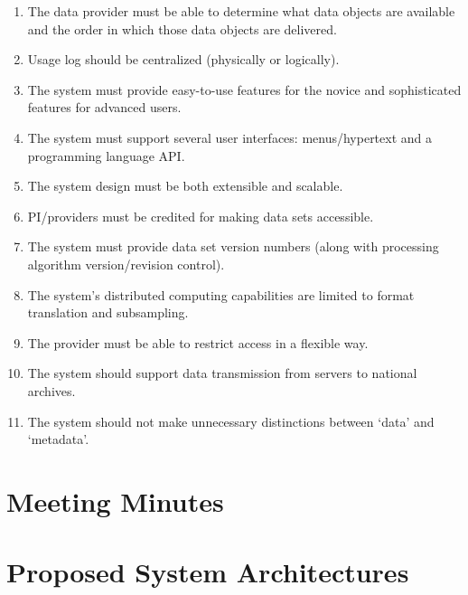\begin{enumerate}
\item The data provider must be able to determine what data objects are
available and the order in which those data objects are delivered.

\item Usage log should be centralized (physically or logically).

\item The system must provide easy-to-use features for the novice and
sophisticated features for advanced users.

\item The system must support several user interfaces: menus/hypertext and
a programming language API.

\item The system design must be both extensible and scalable.

\item PI/providers must be credited for making data sets accessible.

\item The system must provide data set version numbers (along with processing
algorithm version/revision control).

\item The system's distributed computing capabilities are limited to format
translation and subsampling.

\item The provider must be able to restrict access in a flexible way.

\item The system should support data transmission from servers to national
archives.

\item The system should not make unnecessary distinctions between `data' and
`metadata'.

\end{enumerate}

\newpage

\section{\bf Meeting Minutes}



\newpage
\section{\bf Proposed System Architectures}


